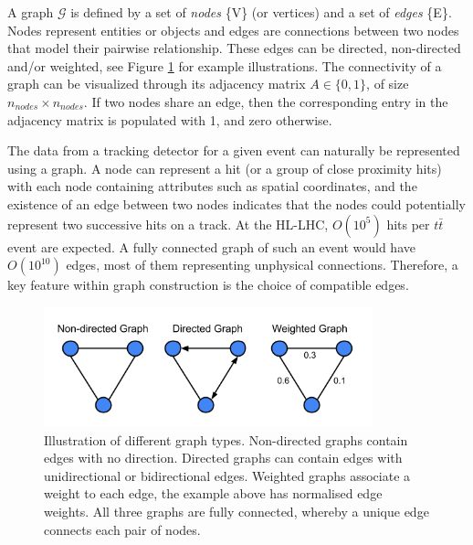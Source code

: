 
A graph $\mathcal{G}$ is defined by a set of \textit{nodes} \{V\} (or vertices) and a set of \textit{edges} \{E\}. Nodes represent entities or objects and edges are connections between two nodes that model their pairwise relationship. These edges can be directed, non-directed and/or weighted, see Figure \ref{fig:graph-architecture-example} for example illustrations. The connectivity of a graph can be visualized through its adjacency matrix $A \in \{0, 1\}$, of size $n_{nodes} \times n_{nodes}$. If two nodes share an edge, then the corresponding entry in the adjacency matrix is populated with 1, and zero otherwise. 

The data from a tracking detector for a given event can naturally be represented using a graph. A node can represent a hit (or a group of close proximity hits) with each node containing attributes such as spatial coordinates, and the existence of an edge between two nodes indicates that the nodes could potentially represent two successive hits on a track. At the HL-LHC, $O(10^{5})$ hits per $t\bar{t}$ event are expected. A fully connected graph of such an event would have $O(10^{10})$ edges, most of them representing unphysical connections. Therefore, a key feature within graph construction is the choice of compatible edges. 

\begin{figure}[!htbp]
  \centering
  \includegraphics[width=0.85\textwidth]{images/3-track-reconstruction/Graphs.png}
  \caption{
    Illustration of different graph types. Non-directed graphs contain edges with no direction. Directed graphs can contain edges with unidirectional or bidirectional edges. Weighted graphs associate a weight to each edge, the example above has normalised edge weights. All three graphs are fully connected, whereby a unique edge connects each pair of nodes.
  }
  \label{fig:graph-architecture-example}
\end{figure}


